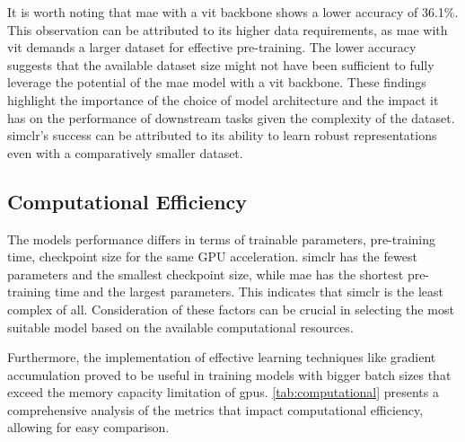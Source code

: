 It is worth noting that \gls{mae} with a \gls{vit} backbone shows a lower accuracy of 36.1\%. This observation can be attributed to its higher data requirements, as \gls{mae} with \gls{vit} demands a larger dataset for effective pre-training. The lower accuracy suggests that the available dataset size might not have been sufficient to fully leverage the potential of the \gls{mae} model with a \gls{vit} backbone. These findings highlight the importance of the choice of model architecture and the impact it has on the performance of downstream tasks given the complexity of the dataset. \gls{simclr}’s success can be attributed to its ability to learn robust representations even with a comparatively smaller dataset.

\subsection{Computational Efficiency}

The models performance differs in terms of trainable parameters, pre-training time, checkpoint size for the same GPU acceleration. \gls{simclr} has the fewest parameters and the smallest checkpoint size, while \gls{mae} has the shortest pre-training time and the largest parameters. This indicates that \gls{simclr} is the least complex of all. Consideration of these factors can be crucial in selecting the most suitable model based on the available computational resources.

Furthermore, the implementation of effective learning techniques like gradient accumulation proved to be useful in training models with bigger batch sizes that exceed the memory capacity limitation of \glspl{gpu}. \cref{tab:computational} presents a comprehensive analysis of the metrics that impact computational efficiency, allowing for easy comparison. 



